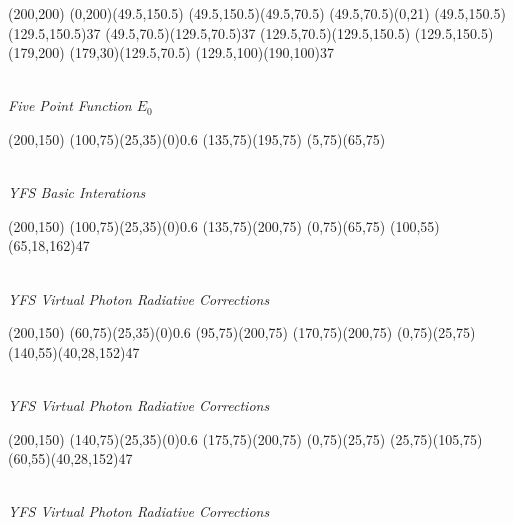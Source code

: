 \documentclass{article}
\begin{document}
\begin{center}
	\begin{axopicture}(200,200)
		\Line[arrow](0,200)(49.5,150.5)
		\Line[arrow](49.5,150.5)(49.5,70.5)
		\Line[arrow](49.5,70.5)(0,21)
		\Photon(49.5,150.5)(129.5,150.5){3}{7}
		\Photon(49.5,70.5)(129.5,70.5){3}{7}
		\Line[arrow](129.5,70.5)(129.5,150.5)
		\Line[arrow](129.5,150.5)(179,200)
		\Line[arrow](179,30)(129.5,70.5)
		\Photon(129.5,100)(190,100){3}{7}
	\end{axopicture}
	\\ {\sl Five Point Function $E_0$}
\end{center}

\begin{center}
	\begin{axopicture}(200,150)
		\GOval(100,75)(25,35)(0){0.6}
		\Line[arrow](135,75)(195,75)
		\Line[arrow](5,75)(65,75)
	\end{axopicture}
	\\ {\sl YFS Basic Interations}
\end{center}       

\begin{center}
	\begin{axopicture}(200,150)
		\GOval(100,75)(25,35)(0){0.6}
		\Line[arrow](135,75)(200,75)
		\Line[arrow](0,75)(65,75)
		\PhotonArc(100,55)(65,18,162){4}{7}
	\end{axopicture}
	\\ {\sl YFS Virtual Photon Radiative Corrections}
\end{center}  

\begin{center}
	\begin{axopicture}(200,150)
		\GOval(60,75)(25,35)(0){0.6}
		\Line[arrow](95,75)(200,75)
		\Line[arrow](170,75)(200,75)
		\Line[arrow](0,75)(25,75)
		\PhotonArc(140,55)(40,28,152){4}{7}
	\end{axopicture}
	\\ {\sl YFS Virtual Photon Radiative Corrections}
\end{center} 

\begin{center}
	\begin{axopicture}(200,150)
		\GOval(140,75)(25,35)(0){0.6}
		\Line[arrow](175,75)(200,75)
		\Line[arrow](0,75)(25,75)
		\Line[arrow](25,75)(105,75)
		\PhotonArc(60,55)(40,28,152){4}{7}
		\end{axopicture}
		\\ {\sl YFS Virtual Photon Radiative Corrections}
\end{center} 
\end{document}

